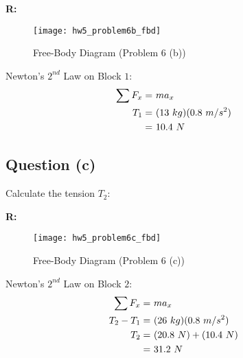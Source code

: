 		\textbf{R:} \newline

		\begin{figure}[H]
			\begin{center}
				\texttt{[image: hw5\_problem6b\_fbd]}
				\caption{Free-Body Diagram (Problem 6 (b))}
				\label{fig:hw5_problem6b_fbd}
			\end{center}
		\end{figure}

		Newton's $2^{nd}$ Law on Block $1$:
		\begin{align}
			\sum F_{x} = \ &ma_{x}& \notag \\
			T_{1} = \ &(13 \ kg)(0.8 \ m/s^{2})& \notag \\
			= \ &10.4 \ N&
		\end{align}

	\subsection{Question (c)}

		Calculate the tension $T_{2}$:

		\textbf{R:} \newline

		\begin{figure}[H]
			\begin{center}
				\texttt{[image: hw5\_problem6c\_fbd]}
				\caption{Free-Body Diagram (Problem 6 (c))}
				\label{fig:hw5_problem6c_fbd}
			\end{center}
		\end{figure}

		Newton's $2^{nd}$ Law on Block $2$:
		\begin{align}
			\sum F_{x} = \ &ma_{x}& \notag \\
			T_{2} - T_{1} = \ &(26 \ kg)(0.8 \ m/s^{2})& \notag \\
			T_{2} = \ &(20.8 \ N) + (10.4 \ N)& \notag \\
			= \ &31.2 \ N&
		\end{align}
